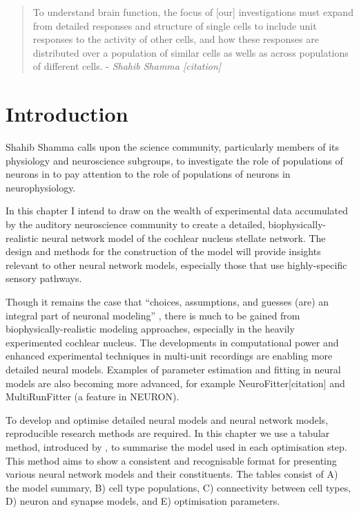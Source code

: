  

\begin{quotation}
  To understand brain function, the focus of [our] investigations must
  expand from detailed responses and structure of single cells to
  include unit responses to the activity of other cells, and how these
  responses are distributed over a population of similar cells as
  wells as across populations of different cells.  - \emph{Shahib Shamma [citation]}
\end{quotation}


\section{Introduction}

Shahib Shamma calls upon the science community, particularly members
of its physiology and neuroscience subgroups, to investigate the role
of populations of neurons in to pay attention to the role of
populations of neurons in neurophysiology.

In this chapter I intend to draw on the wealth of experimental data
accumulated by the auditory neuroscience community to create a
detailed, biophysically-realistic neural network model of the cochlear
nucleus stellate network.  The design and methods for the construction
of the model will provide insights relevant to other neural network
models, especially those that use highly-specific sensory pathways.

Though it remains the case that ``choices, assumptions, and guesses
(are) an integral part of neuronal modeling''
\citep{SegevBurkeEtAl:1998}, there is much to be gained from
biophysically-realistic modeling approaches, especially in the heavily
experimented cochlear nucleus. The developments in computational power
and enhanced experimental techniques in multi-unit recordings are
enabling more detailed neural models. Examples of parameter estimation
and fitting in neural models are also becoming more advanced, for
example NeuroFitter[citation] and MultiRunFitter (a feature in
NEURON).  

\medskip{}

  To develop and optimise detailed neural models and
neural network models, reproducible research methods are required. In
this chapter we use a tabular method, introduced by
\citet{NordlieGewaltigEtAl:2009}, to summarise the model used in each
optimisation step. This method aims to show a consistent and
recognisable format for presenting various neural network models and
their constituents.  The tables consist of A) the model summary, B)
cell type populations, C) connectivity between cell types, D) neuron
and synapse models, and E) optimisation parameters.

